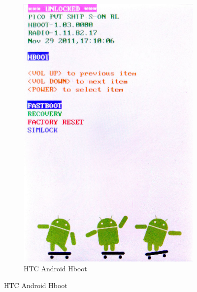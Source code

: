 \documentclass[t]{beamer}
\begin{document}
\begin{frame}
\begin{figure}
\begin{subfigure}[f]{0.3\textwidth}
			\includegraphics[width=\textwidth]{androidHboot.jpg}
			\caption*{HTC Android Hboot}
		\end{subfigure}
	\end{figure}
\end{frame}
\end{document}
